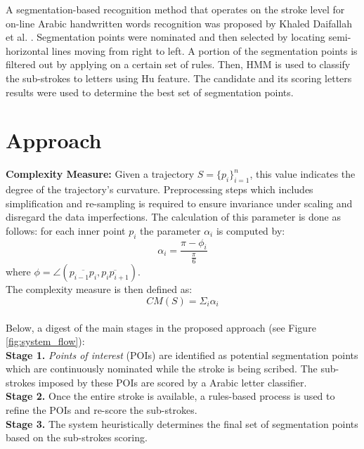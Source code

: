 \documentclass[10pt, conference, compsocconf]{IEEEtran}
\begin{document}
A segmentation-based recognition method that operates on the stroke level for on-line Arabic handwritten words recognition was proposed by Khaled Daifallah et al. \cite{daifallah2009recognition}. 
Segmentation points were nominated and then selected by locating semi-horizontal lines moving from right to left. 
A portion of the segmentation points is filtered out by applying on a certain set of rules. 
Then, HMM is used to classify the sub-strokes to letters using Hu feature. 
The candidate and its scoring letters results were used to determine the best set of segmentation points.\\


\section{Approach}
\label{sec:approach}

\textbf{Complexity Measure:} Given a trajectory $S=\{{p_i}\}_{i=1}^{n}$, this value indicates the degree of the trajectory's curvature. 
Preprocessing steps which includes simplification and re-sampling is required to ensure invariance under scaling and disregard the data imperfections. 
The calculation of this parameter is done as follows: for each inner point $p_i$ the parameter $\alpha_{i}$ is computed by:
\begin{equation}
 \alpha_{i}=\frac{\pi-\phi_{i}}{\frac{\pi}{6}}
\end{equation}
where $\phi=\angle(\overline{p_{i-1}p_{i}},\overline{p_{i}p_{i+1}})$.\\ 
The complexity measure is then defined as:
\begin{equation}
CM(S)=\Sigma_{i}\alpha_{i}
\end{equation}\\

{\color{blue}
Below, a digest of the main stages in the proposed approach (see Figure \ref{fig:system_flow}):\\
\textbf{Stage 1.}  \emph{Points of interest} (POIs) are identified as potential segmentation points which are continuously nominated while the stroke is being scribed. The sub-strokes imposed by these POIs are scored by a Arabic letter classifier.\\
\textbf{Stage 2.} Once the entire stroke is available, a rules-based process is used to refine the POIs and re-score the sub-strokes.\\
\textbf{Stage 3.} The system heuristically determines the final set of segmentation points based on the sub-strokes scoring.}\\
\end{document}
